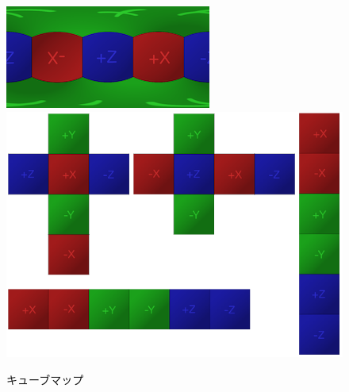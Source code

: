 \begin{figure}[p]
  \centering
  \includegraphics[scale=1.0]{fig/cubemap1.png}
  \includegraphics[scale=0.6]{fig/cubemap2.png}
  \caption{キューブマップ\cite{32}}\label{Cubemap}
\end{figure}
